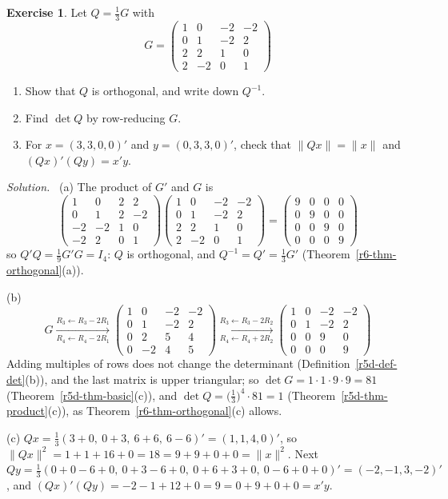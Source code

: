 \documentclass[12pt]{article}
\theoremstyle{definition}
\newtheorem{exercise}{Exercise}
\newenvironment{solution}{\par\noindent\textit{Solution.}\ }{\par\smallskip}
\begin{document}
\begin{exercise}\label{r6-dr-orthogonal}
Let \(Q=\frac13G\) with
\[
G=\begin{pmatrix}1&0&-2&-2\\0&1&-2&2\\2&2&1&0\\2&-2&0&1\end{pmatrix}
\]
\begin{enumerate}
\item Show that \(Q\) is orthogonal, and write down \(Q^{-1}\).
\item Find \(\det Q\) by row-reducing \(G\).
\item For \(x=(3,3,0,0)'\) and \(y=(0,3,3,0)'\), check that \(\lVert Qx\rVert=\lVert x\rVert\) and \((Qx)'(Qy)=x'y\).
\end{enumerate}
\end{exercise}
\begin{solution}
(a) The product of \(G'\) and \(G\) is
\[
\begin{pmatrix}1&0&2&2\\0&1&2&-2\\-2&-2&1&0\\-2&2&0&1\end{pmatrix}\begin{pmatrix}1&0&-2&-2\\0&1&-2&2\\2&2&1&0\\2&-2&0&1\end{pmatrix}
=\begin{pmatrix}9&0&0&0\\0&9&0&0\\0&0&9&0\\0&0&0&9\end{pmatrix}
\]
so \(Q'Q=\frac19G'G=I_4\): \(Q\) is orthogonal, and \(Q^{-1}=Q'=\frac13G'\) (Theorem~\ref{r6-thm-orthogonal}(a)).

(b)
\[
G\xrightarrow[R_4\leftarrow R_4-2R_1]{R_3\leftarrow R_3-2R_1}
\begin{pmatrix}1&0&-2&-2\\0&1&-2&2\\0&2&5&4\\0&-2&4&5\end{pmatrix}
\xrightarrow[R_4\leftarrow R_4+2R_2]{R_3\leftarrow R_3-2R_2}
\begin{pmatrix}1&0&-2&-2\\0&1&-2&2\\0&0&9&0\\0&0&0&9\end{pmatrix}
\]
Adding multiples of rows does not change the determinant (Definition~\ref{r5d-def-det}(b)), and the last matrix
is upper triangular; so \(\det G=1\cdot1\cdot9\cdot9=81\) (Theorem~\ref{r5d-thm-basic}(c)), and
\(\det Q=\bigl(\frac13\bigr)^4\cdot81=1\) (Theorem~\ref{r5d-thm-product}(c)), as
Theorem~\ref{r6-thm-orthogonal}(c) allows.

(c) \(Qx=\frac13(3+0,\ 0+3,\ 6+6,\ 6-6)'=(1,1,4,0)'\), so \(\lVert Qx\rVert^2=1+1+16+0=18=9+9+0+0=\lVert x\rVert^2\). Next
\(Qy=\frac13(0+0-6+0,\ 0+3-6+0,\ 0+6+3+0,\ 0-6+0+0)'=(-2,-1,3,-2)'\), and
\((Qx)'(Qy)=-2-1+12+0=9=0+9+0+0=x'y\).
\end{solution}
\end{document}
